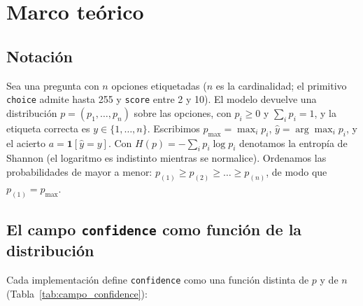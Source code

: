 \section{Marco teórico}
\label{sec:marco_teorico}

\subsection{Notación}

Sea una pregunta con $n$ opciones etiquetadas ($n$ es la cardinalidad; el primitivo \texttt{choice} admite
hasta 255 y \texttt{score} entre 2 y 10). El modelo devuelve una distribución $p = (p_1, \dots, p_n)$ sobre
las opciones, con $p_i \ge 0$ y $\sum_i p_i = 1$, y la etiqueta correcta es $y \in \{1,\dots,n\}$.
Escribimos $p_{\max} = \max_i p_i$, $\hat{y} = \arg\max_i p_i$, y el acierto $a = \mathbf{1}[\hat{y} = y]$.
Con $H(p) = -\sum_i p_i \log p_i$ denotamos la entropía de Shannon (el logaritmo es indistinto mientras se
normalice). Ordenamos las probabilidades de mayor a menor: $p_{(1)} \ge p_{(2)} \ge \dots \ge p_{(n)}$, de
modo que $p_{(1)} = p_{\max}$.

\subsection{El campo \texttt{confidence} como función de la distribución}

Cada implementación define \texttt{confidence} como una función distinta de $p$ y de $n$ (Tabla~\ref{tab:campo_confidence}):

\begin{table}[t]
\centering
\caption{Definiciones de \texttt{confidence} como función de la distribución $p$ y de la cardinalidad $n$.}
\label{tab:campo_confidence}
\footnotesize
{}
\end{table}

